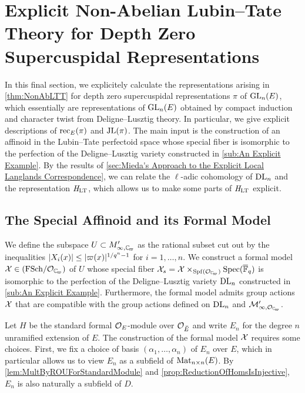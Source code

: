 \documentclass[../main.tex]{subfiles}
\begin{document}
\section{Explicit Non-Abelian Lubin--Tate Theory for Depth Zero Supercuspidal
Representations} %
\label{sec:Explicit Non-Abelian Lubin-Tate Theory for Depth Zero Supercuspidal Representations}
In this final section, we explicitely calculate the representations
arising in \cref{thm:NonAbLTT} for depth zero supercuspidal
representations $\pi$ of $\operatorname{GL}_n(E)$, which essentially are representations
of $\operatorname{GL}_n(E)$
obtained by compact induction and character twist from Deligne--Lusztig theory. In
particular, we give explicit descriptions of $\mathrm{rec}_E(\pi)$ and $\mathrm{JL}(\pi)$. 
The main input is the construction of an affinoid in the Lubin--Tate perfectoid
space whose special fiber is isomorphic to the perfection of the Deligne--Lusztig variety constructed in \cref{sub:An Explicit Example}.
By the results of \cref{sec:Mieda's Approach to the Explicit Local Langlands Correspondence}, we can 
relate the $\ell$-adic cohomology of $\mathrm{DL}_n$
and the representation $\mathit H_{\mathrm{LT}}$, which allows us to make some parts of $\mathit H_{\mathrm{LT}}$ explicit.

\subsection{The Special Affinoid and its Formal Model} %
\label{sub:The Special Affinoid}
We define the subspace $U \subset M'_{\infty,\Cp}$ as the rational
subset cut out by the inequalities $\lvert X_i(x) \rvert \leq \lvert \varpi(x) \rvert^{1/q^n-1}$ for
$i = 1, \dots, n$. We construct a formal model $\cX \in \FSchOver {\cO_{\Cp}}$
of $U$ whose special fiber $\cX_s = 
\cX \times_{\spf(\cO_{\Cp})}\spec(\bar \FF_q)$ is isomorphic to the perfection of the
Deligne--Lusztig variety $\mathrm{DL}_n$ constructed in \cref{sub:An Explicit Example}.
Furthermore, the formal model admits group actions $\mathcal{X}$ that are compatible with the group actions
defined on $\mathrm{DL}_n$ and $\cM_{\infty, \cO_\Cp}'$. 

Let $H$ be the standard formal $\mathcal{O}_E$-module over $\mathcal{O}_{\breve {E}}$ and write
$E_n$ for the degree $n$ unramified extension of $E$. 
The construction of the formal model $\mathcal{X}$ requires some choices. 
First, we fix a choice of basis $(\alpha_1, \dots, \alpha_n)$ of $E_n$ over $E$, 
which in particular allows us to view $E_n$ as a subfield of $\operatorname{Mat}_{n \times n}(E)$. 
By \cref{lem:MultByROUForStandardModule} and
\cref{prop:ReductionOfHomsIsInjective}, $E_n$ is also naturally a subfield of
$D$.
\end{document}
